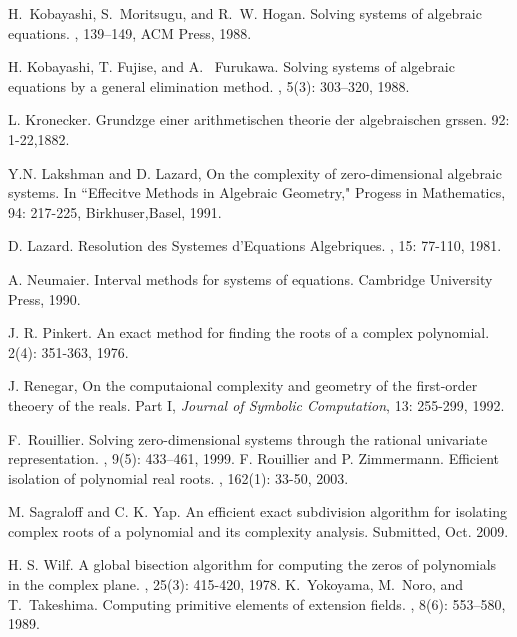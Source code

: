 \documentclass[amsthm]{JSC_LaTex_2007_Mar_12/elsart}
\begin{document}
\begin{thebibliography}{99}
H.~Kobayashi, S.~Moritsugu, and R.~W. Hogan.
\newblock Solving systems of algebraic equations.
, 139--149, ACM Press, 1988.

H. Kobayashi, T. Fujise, and A.~ Furukawa.
\newblock Solving systems of algebraic equations by a general elimination method.
, 5(3): 303--320, 1988.

L. Kronecker.
\newblock Grundzge einer arithmetischen theorie der algebraischen grssen.
 92: 1-22,1882.

Y.N. Lakshman and D. Lazard,
\newblock On the complexity of zero-dimensional algebraic systems.
\newblock In ``Effecitve Methods in Algebraic Geometry," Progess in Mathematics, 94: 217-225, Birkhuser,Basel, 1991.


D. Lazard.
\newblock Resolution des Systemes d'Equations Algebriques.
, 15: 77-110, 1981.

A. Neumaier.
\newblock Interval methods for systems of equations.
\newblock Cambridge University Press, 1990.

J. R. Pinkert.
\newblock An exact method for finding the roots of a complex
polynomial.
 2(4): 351-363, 1976.  

J. Renegar,
\newblock On the computaional complexity and geometry of the first-order theoery of the reals.
\newblock Part I, {\em Journal of Symbolic Computation}, 13: 255-299, 1992.

F.~Rouillier.
\newblock Solving zero-dimensional systems through the rational univariate
  representation.
,
  9(5): 433--461, 1999.
 F. Rouillier and P. Zimmermann.
\newblock Efficient isolation of
polynomial real roots.
, {162}(1):
33-50, 2003.

M. Sagraloff and C. K. Yap.
\newblock An efficient exact subdivision algorithm for isolating complex roots
of a polynomial and its complexity analysis.
\newblock Submitted, Oct. 2009.

H. S. Wilf.
\newblock A global bisection algorithm for computing the
zeros of polynomials in the complex plane.
, 25(3): 415-420, 1978. 
K.~Yokoyama, M.~Noro, and T.~Takeshima.
\newblock Computing primitive elements of extension fields.
, 8(6): 553--580, 1989.
\end{thebibliography}
\end{document}

